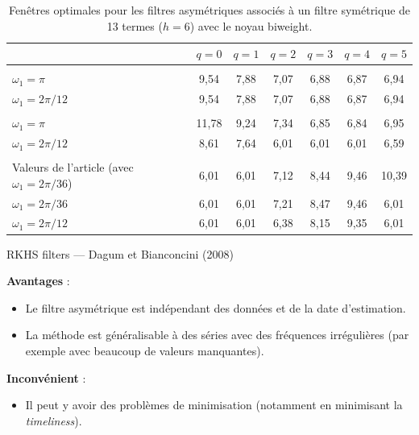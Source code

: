 \documentclass[
  12pt,
  french,
  12pt,a4paper]{article}
\providecommand{\tightlist}{%
  \setlength{\itemsep}{0pt}\setlength{\parskip}{0pt}}
\newcommand\1{\mathds{1}}
\begin{document}
\begin{table}[!h]

\caption{\label{tab:optimalbwrkhs}Fenêtres optimales pour les filtres asymétriques associés à un filtre symétrique de 13 termes ($h=6$) avec le noyau biweight.}
\centering
\begin{tabular}[t]{lcccccc}
\toprule
  & $q=0$ & $q=1$ & $q=2$ & $q=3$ & $q=4$ & $q=5$\\
\midrule
\addlinespace[0.3em]
\multicolumn{7}{l}{\textbf{$b_{q,\Gamma}$}}\\
\hspace{1em}$\omega_1 = \pi$ & 9,54 & 7,88 & 7,07 & 6,88 & 6,87 & 6,94\\
\hspace{1em}$\omega_1 = 2\pi/12$ & 9,54 & 7,88 & 7,07 & 6,88 & 6,87 & 6,94\\
\addlinespace[0.3em]
\multicolumn{7}{l}{\textbf{$b_{q,G}$}}\\
\hspace{1em}$\omega_1 = \pi$ & 11,78 & 9,24 & 7,34 & 6,85 & 6,84 & 6,95\\
\hspace{1em}$\omega_1 = 2\pi/12$ & 8,61 & 7,64 & 6,01 & 6,01 & 6,01 & 6,59\\
\addlinespace[0.3em]
\multicolumn{7}{l}{\textbf{$b_{q,\varphi}$}}\\
\hspace{1em}Valeurs de l'article (avec $\omega_1 = 2\pi/36$) & 6,01 & 6,01 & 7,12 & 8,44 & 9,46 & 10,39\\
\hspace{1em}$\omega_1 = 2\pi/36$ & 6,01 & 6,01 & 7,21 & 8,47 & 9,46 & 6,01\\
\hspace{1em}$\omega_1 = 2\pi/12$ & 6,01 & 6,01 & 6,38 & 8,15 & 9,35 & 6,01\\
\bottomrule
\end{tabular}
\end{table}

\begin{summary_box}{RKHS filters --- Dagum et Bianconcini (2008)}

\textbf{Avantages} :

\begin{itemize}
\item
  Le filtre asymétrique est indépendant des données et de la date d'estimation.
\item
  La méthode est généralisable à des séries avec des fréquences irrégulières (par exemple avec beaucoup de valeurs manquantes).
\end{itemize}

\textbf{Inconvénient} :

\begin{itemize}
\tightlist
\item
  Il peut y avoir des problèmes de minimisation (notamment en minimisant la \emph{timeliness}).
\end{itemize}

\end{summary_box}
\end{document}
